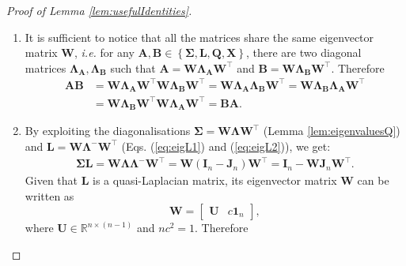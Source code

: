 \documentclass[12pt]{article}
\theoremstyle{plain}
\theoremstyle{remark}
\newcommand{\curly}[1]{\left\{ #1 \right\}}
\newcommand{\R}[0]{\mathbb{R}}
\newcommand{\onen}[0]{{\mathbf{1}_{n}}}
\newcommand{\ie}{\textit{i.e. }}
\newcommand{\latMatr}[1]{\mathbf{#1}}          %
\newcommand{\grMatr}[1]{{\boldsymbol{#1}}}   %
\newcommand{\matr}[1]{\mathbf{#1}}          %
\begin{document}
    \begin{proof}[Proof of Lemma \ref{lem:usefulIdentities}]
        \begin{enumerate}
            \item It is sufficient to notice that all the matrices share the same eigenvector matrix $\latMatr W$, \ie for any ${\latMatr{A}},{\latMatr{B}}\in\curly{{\grMatr{\Sigma}},\latMatr L,\latMatr Q,\latMatr X}$, there are two diagonal matrices $\grMatr{\Lambda}_{\latMatr{A}},\grMatr{\Lambda}_{\latMatr{B}}$ such that ${\latMatr{A}}=\latMatr W \grMatr{\Lambda}_{\latMatr{A}}\matr  W^\top$ and ${\latMatr{B}}=\latMatr W \grMatr{\Lambda}_{\latMatr{B}} \latMatr W^\top$. Therefore 
            \begin{align*}
                {\latMatr{A}}{\latMatr{B}}&=\latMatr W \grMatr{\Lambda}_{\latMatr{A}} \latMatr W^\top \latMatr W \grMatr{\Lambda}_{\latMatr{B}} \latMatr W^\top=\latMatr W \grMatr{\Lambda}_{\latMatr{A}} \grMatr{\Lambda}_{\latMatr{B}} \latMatr W^\top = \latMatr W \grMatr{\Lambda}_{\latMatr{B}} \grMatr{\Lambda}_{\latMatr{A}} \latMatr W^\top\\
                &=\latMatr W\grMatr{\Lambda}_{\latMatr{B}} \latMatr W^\top \latMatr W \grMatr{\Lambda}_{\latMatr{A}} \latMatr W^\top = {\latMatr{B}}{\latMatr{A}}.
            \end{align*}
            \item By exploiting the diagonalisations ${\grMatr{\Sigma}} = \latMatr W \grMatr{\Lambda} \latMatr W^\top$ (Lemma \ref{lem:eigenvaluesQ}) and ${\latMatr{L}}= \latMatr W \grMatr{\Lambda}^- \latMatr W^\top$ (Eqs. (\ref{eq:eigL1}) and (\ref{eq:eigL2})), we get:
            \begin{align*}
                {\grMatr{\Sigma}} {\latMatr{L}}= \latMatr W \grMatr{\Lambda} \grMatr{\Lambda}^- \latMatr W^\top = \latMatr W (\latMatr{I}_n - \latMatr{J}_n) \latMatr W^\top = \latMatr{I}_n - \latMatr W \latMatr{J}_n \latMatr W^\top. 
            \end{align*}
            Given that $\latMatr L$ is a quasi-Laplacian matrix, its eigenvector matrix $\latMatr W$ can be written as
            \begin{equation*}
                \latMatr W = \begin{bmatrix}
                    \latMatr U & c \onen
                \end{bmatrix},
            \end{equation*}
            where $\latMatr U \in \R^{n \times (n-1)}$ and $n c^2=1$. Therefore

\end{enumerate}
\end{proof}
\end{document}
